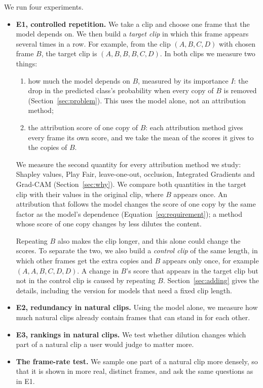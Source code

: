 We run four experiments.
\begin{itemize}
  \item \textbf{E1, controlled repetition.} We take a clip and choose one frame that the model depends on. We then build a \emph{target clip} in which this frame appears several times in a row. For example, from the clip $(A, B, C, D)$ with chosen frame $B$, the target clip is $(A, B, B, B, C, D)$. In both clips we measure two things:
  \begin{enumerate}
    \item how much the model depends on $B$, measured by its importance $I$: the drop in the predicted class's probability when every copy of $B$ is removed (Section~\ref{sec:problem}). This uses the model alone, not an attribution method;
    \item the attribution score of one copy of $B$: each attribution method gives every frame its own score, and we take the mean of the scores it gives to the copies of $B$.
  \end{enumerate}
  We measure the second quantity for every attribution method we study: Shapley values, Play Fair, leave-one-out, occlusion, Integrated Gradients and Grad-CAM (Section~\ref{sec:why}). We compare both quantities in the target clip with their values in the original clip, where $B$ appears once. An attribution that follows the model changes the score of one copy by the same factor as the model's dependence (Equation~\ref{eq:requirement}); a method whose score of one copy changes by less dilutes the content.

  Repeating $B$ also makes the clip longer, and this alone could change the scores. To separate the two, we also build a \emph{control clip} of the same length, in which other frames get the extra copies and $B$ appears only once, for example $(A, A, B, C, D, D)$. A change in $B$'s score that appears in the target clip but not in the control clip is caused by repeating $B$. Section~\ref{sec:adding} gives the details, including the version for models that need a fixed clip length.
  \item \textbf{E2, redundancy in natural clips.} Using the model alone, we measure how much natural clips already contain frames that can stand in for each other.
  \item \textbf{E3, rankings in natural clips.} We test whether dilution changes which part of a natural clip a user would judge to matter more.
  \item \textbf{The frame-rate test.} We sample one part of a natural clip more densely, so that it is shown in more real, distinct frames, and ask the same questions as in E1.
\end{itemize}
